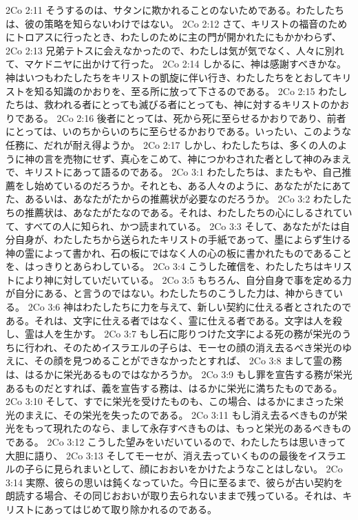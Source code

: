 2Co 2:11  そうするのは、サタンに欺かれることのないためである。わたしたちは、彼の策略を知らないわけではない。
2Co 2:12  さて、キリストの福音のためにトロアスに行ったとき、わたしのために主の門が開かれたにもかかわらず、
2Co 2:13  兄弟テトスに会えなかったので、わたしは気が気でなく、人々に別れて、マケドニヤに出かけて行った。
2Co 2:14  しかるに、神は感謝すべきかな。神はいつもわたしたちをキリストの凱旋に伴い行き、わたしたちをとおしてキリストを知る知識のかおりを、至る所に放って下さるのである。
2Co 2:15  わたしたちは、救われる者にとっても滅びる者にとっても、神に対するキリストのかおりである。
2Co 2:16  後者にとっては、死から死に至らせるかおりであり、前者にとっては、いのちからいのちに至らせるかおりである。いったい、このような任務に、だれが耐え得ようか。
2Co 2:17  しかし、わたしたちは、多くの人のように神の言を売物にせず、真心をこめて、神につかわされた者として神のみまえで、キリストにあって語るのである。
2Co 3:1  わたしたちは、またもや、自己推薦をし始めているのだろうか。それとも、ある人々のように、あなたがたにあてた、あるいは、あなたがたからの推薦状が必要なのだろうか。
2Co 3:2  わたしたちの推薦状は、あなたがたなのである。それは、わたしたちの心にしるされていて、すべての人に知られ、かつ読まれている。
2Co 3:3  そして、あなたがたは自分自身が、わたしたちから送られたキリストの手紙であって、墨によらず生ける神の霊によって書かれ、石の板にではなく人の心の板に書かれたものであることを、はっきりとあらわしている。
2Co 3:4  こうした確信を、わたしたちはキリストにより神に対していだいている。
2Co 3:5  もちろん、自分自身で事を定める力が自分にある、と言うのではない。わたしたちのこうした力は、神からきている。
2Co 3:6  神はわたしたちに力を与えて、新しい契約に仕える者とされたのである。それは、文字に仕える者ではなく、霊に仕える者である。文字は人を殺し、霊は人を生かす。
2Co 3:7  もし石に彫りつけた文字による死の務が栄光のうちに行われ、そのためイスラエルの子らは、モーセの顔の消え去るべき栄光のゆえに、その顔を見つめることができなかったとすれば、
2Co 3:8  まして霊の務は、はるかに栄光あるものではなかろうか。
2Co 3:9  もし罪を宣告する務が栄光あるものだとすれば、義を宣告する務は、はるかに栄光に満ちたものである。
2Co 3:10  そして、すでに栄光を受けたものも、この場合、はるかにまさった栄光のまえに、その栄光を失ったのである。
2Co 3:11  もし消え去るべきものが栄光をもって現れたのなら、まして永存すべきものは、もっと栄光のあるべきものである。
2Co 3:12  こうした望みをいだいているので、わたしたちは思いきって大胆に語り、
2Co 3:13  そしてモーセが、消え去っていくものの最後をイスラエルの子らに見られまいとして、顔におおいをかけたようなことはしない。
2Co 3:14  実際、彼らの思いは鈍くなっていた。今日に至るまで、彼らが古い契約を朗読する場合、その同じおおいが取り去られないままで残っている。それは、キリストにあってはじめて取り除かれるのである。
